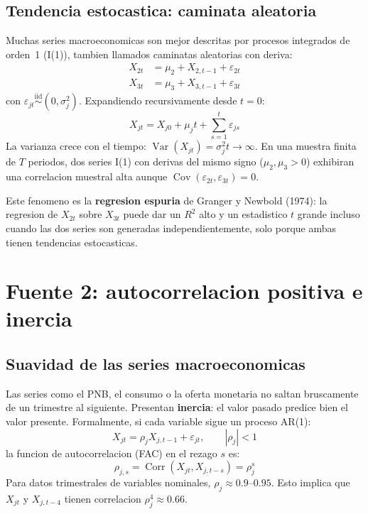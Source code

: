 \documentclass[12pt, letterpaper]{article}
\theoremstyle{remark}
\newcommand{\Var}{\operatorname{Var}}
\newcommand{\Cov}{\operatorname{Cov}}
\newcommand{\Corr}{\operatorname{Corr}}
\begin{document}
\subsection{Tendencia estocastica: caminata aleatoria}

Muchas series macroeconomicas son mejor descritas por procesos integrados
de orden~1 (I(1)), tambien llamados caminatas aleatorias con deriva:
\begin{align}
  X_{2t} &= \mu_2 + X_{2,t-1} + \varepsilon_{2t}
  \label{eq:rw2}\\
  X_{3t} &= \mu_3 + X_{3,t-1} + \varepsilon_{3t}
  \label{eq:rw3}
\end{align}
con $\varepsilon_{jt} \overset{\text{iid}}{\sim}(0, \sigma_j^2)$.
Expandiendo recursivamente desde $t=0$:
\begin{equation}
  X_{jt} = X_{j0} + \mu_j t + \sum_{s=1}^{t}\varepsilon_{js}
  \label{eq:rw_expand}
\end{equation}
La varianza crece con el tiempo: $\Var(X_{jt}) = \sigma_j^2 t \to \infty$.
En una muestra finita de $T$ periodos, dos series I(1) con derivas del mismo
signo ($\mu_2, \mu_3 > 0$) exhibiran una correlacion muestral alta aunque
$\Cov(\varepsilon_{2t}, \varepsilon_{3t}) = 0$.

Este fenomeno es la \textbf{regresion espuria} de Granger y Newbold (1974):
la regresion de $X_{2t}$ sobre $X_{3t}$ puede dar un $R^2$ alto y un
estadistico $t$ grande incluso cuando las dos series son generadas
independientemente, solo porque ambas tienen tendencias estocasticas.

\section{Fuente 2: autocorrelacion positiva e inercia}

\subsection{Suavidad de las series macroeconomicas}

Las series como el PNB, el consumo o la oferta monetaria no saltan
bruscamente de un trimestre al siguiente. Presentan \textbf{inercia}: el
valor pasado predice bien el valor presente. Formalmente, si cada variable
sigue un proceso AR(1):
\begin{equation}
  X_{jt} = \rho_j X_{j,t-1} + \varepsilon_{jt},
  \qquad |\rho_j| < 1
  \label{eq:AR1}
\end{equation}
la funcion de autocorrelacion (FAC) en el rezago $s$ es:
\begin{equation}
  \rho_{j,s} = \Corr(X_{jt}, X_{j,t-s}) = \rho_j^s
  \label{eq:FAC}
\end{equation}
Para datos trimestrales de variables nominales, $\rho_j \approx 0.9$--$0.95$.
Esto implica que $X_{jt}$ y $X_{j,t-4}$ tienen correlacion $\rho_j^4 \approx 0.66$.
\end{document}
